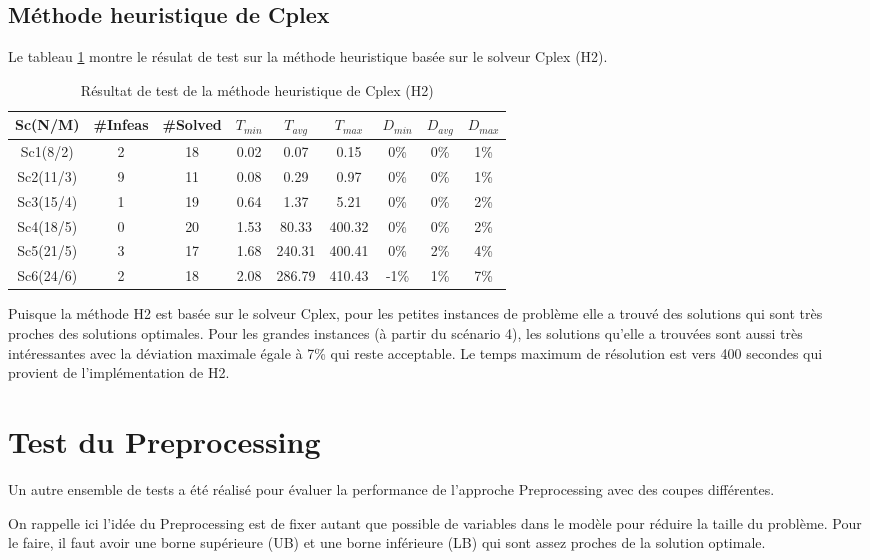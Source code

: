 \documentclass[twoside,fleqn]{EPURapport}
\begin{document}
\subsection{Méthode heuristique de Cplex}
Le tableau \ref{tab_h2} montre le résulat de test sur la méthode heuristique basée sur le solveur Cplex (H2).


\begin{table}[h]
    \centering
    \begin{tabular}{|c|c|c|c|c|c|c|c|c|}
    	\hline
    	Sc(N/M)	& \#Infeas & \#Solved	& $T_{min}$ & $T_{avg}$	& $T_{max}$ & $D_{min}$ & $D_{avg}$	& $D_{max}$ \\ \hline
		Sc1(8/2)  &2 & 18 &  0.02 &  0.07   &0.15     &0\%  &0\%  &1\% \\ \hline
Sc2(11/3) &9 & 11 &  0.08 &  0.29   &0.97     &0\%  &0\%  &1\% \\ \hline
Sc3(15/4) &1 & 19 &  0.64 &  1.37   &5.21     &0\%  &0\%  &2\% \\ \hline
Sc4(18/5) &0 & 20 &  1.53 &  80.33  & 400.32  &0\%  &0\%  &2\% \\ \hline
Sc5(21/5) &3 & 17 &  1.68 &  240.31 &  400.41 & 0\% & 2\% & 4\% \\ \hline
Sc6(24/6) &2 & 18 &  2.08 &  286.79 &  410.43 & -1\%&  1\%&  7\% \\ \hline
    \end{tabular}
    \label{tab_h2}
    \caption{Résultat de test de la méthode heuristique de Cplex (H2)}
\end{table}
\bigskip


Puisque la méthode H2 est basée sur le solveur Cplex, pour les petites instances de problème elle a trouvé des solutions qui sont très proches des solutions optimales. Pour les grandes instances (à partir du scénario 4), les solutions qu'elle a trouvées sont aussi très intéressantes avec la déviation maximale égale à 7\% qui reste acceptable. Le temps maximum de résolution est vers 400 secondes qui provient de l'implémentation de H2.


\section{Test du Preprocessing}
Un autre ensemble de tests a été réalisé pour évaluer la performance de l'approche Preprocessing avec des coupes différentes.

On rappelle ici l'idée du Preprocessing est de fixer autant que possible de variables dans le modèle pour réduire la taille du problème. Pour le faire, il faut avoir une borne supérieure (UB) et une borne inférieure (LB) qui sont assez proches de la solution optimale.
\end{document}
